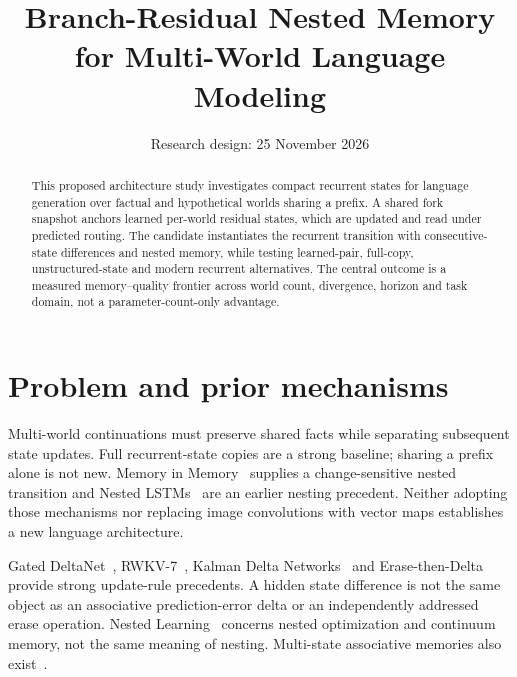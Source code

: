\documentclass[11pt,a4paper]{article}
\title{Branch-Residual Nested Memory for Multi-World Language Modeling}
\author{}
\date{Research design: 25 November 2026}
\begin{document}
\maketitle
\projectstatus
\begin{abstract}
This proposed architecture study investigates compact recurrent states for
language generation over factual and hypothetical worlds sharing a prefix.
A shared fork snapshot anchors learned per-world residual states, which are
updated and read under predicted routing. The candidate instantiates the recurrent
transition with consecutive-state differences and nested memory, while testing
learned-pair, full-copy, unstructured-state and modern recurrent alternatives.
The central outcome is a measured memory--quality frontier across world count,
divergence, horizon and task domain, not a parameter-count-only advantage.
\end{abstract}

\section{Problem and prior mechanisms}
Multi-world continuations must preserve shared facts while separating subsequent
state updates. Full recurrent-state copies are a strong baseline; sharing a
prefix alone is not new. Memory in Memory~\cite{mim} supplies a change-sensitive
nested transition and Nested LSTMs~\cite{nested} are an earlier nesting precedent.
Neither adopting those mechanisms nor replacing image convolutions with vector
maps establishes a new language architecture.

Gated DeltaNet~\cite{gdn}, RWKV-7~\cite{rwkv7}, Kalman Delta Networks~\cite{kdn}
and Erase-then-Delta~\cite{eda} provide strong update-rule precedents. A hidden
state difference is not the same object as an associative prediction-error delta
or an independently addressed erase operation. Nested Learning~\cite{hope} concerns
nested optimization and continuum memory, not the same meaning of nesting.
Multi-state associative memories also exist~\cite{deltamem}.
\end{document}

